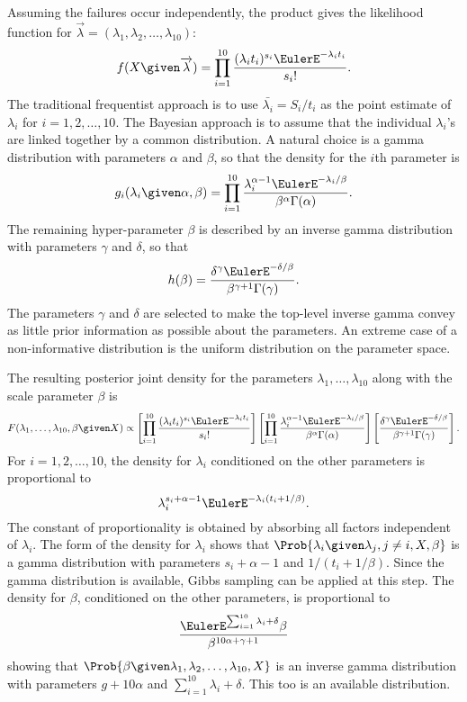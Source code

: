\documentclass[12pt]{article}
\begin{document}
Assuming the failures occur independently, the product gives the
likelihood function for \( \overrightarrow{\lambda} = (\lambda_1,
\lambda_2, \dots, \lambda_{10}) \):
\[
    f(X \given \overrightarrow{\lambda}) = \prod\limits_{i=1}^{10} \frac
    {(\lambda_i t_i)^{s_i} \EulerE^{-\lambda_i t_i}}{s_i!}.
\] The traditional frequentist approach is to use \( \bar{\lambda_i} = S_i/t_i
\) as the point estimate of \( \lambda_i \) for \( i = 1,2, \dots, 10 \).
The Bayesian approach is to assume that the individual \( \lambda_i \)'s
are linked together by a common distribution.  A natural choice is a
gamma distribution with parameters \( \alpha \) and \( \beta \), so that
the density for the \( i \)th parameter is
\[
    g_i(\lambda_i \given \alpha, \beta) =\prod\limits_{i=1}^{10} \frac{\lambda_i^
    {\alpha-1} \EulerE^{-\lambda_i/\beta}}{\beta^{\alpha} \Gamma(\alpha)}.
\] The remaining hyper-parameter \( \beta \) is described by an inverse
gamma distribution with parameters \( \gamma \) and \( \delta \), so
that
\[
    h(\beta) = \frac{\delta^{\gamma} \EulerE^{-\delta/\beta}}{\beta^{\gamma+1}
    \Gamma(\gamma)}.
\] The parameters \( \gamma \) and \( \delta \) are selected to make the
top-level inverse gamma convey as little prior information as possible
about the parameters.  An extreme case of a non-informative distribution
is the uniform distribution on the parameter space.

The resulting posterior joint density for the parameters \( \lambda_1,
 \dots, \lambda_{10} \) along with the scale parameter \(
\beta \) is
\[
    F(\lambda_1, \dots, \lambda_{10}, \beta \given X) \propto
    \left[ \prod_{i=1}^{10} \frac{(\lambda_i t_i)^{s_i} \EulerE^{-\lambda_i
    t_i}}{s_i!} \right] \left[ \prod_{i=1}^{10} \frac{\lambda_i^{\alpha-1}
    \EulerE^{-\lambda_i/\beta}}{\beta^{\alpha} \Gamma(\alpha)} \right]
    \left[ \frac{\delta^{\gamma} \EulerE^{-\delta/\beta}}{\beta^{\gamma+1}
    \Gamma(\gamma)} \right].
\] For \( i = 1,2, \dots, 10 \), the density for \( \lambda_i \)
conditioned on the other parameters is proportional to
\[
    \lambda_i^{s_i + \alpha -1} \EulerE^{-\lambda_i (t_i+1/\beta)}.
\] The constant of proportionality is obtained by absorbing all factors
independent of \( \lambda_i \).  The form of the density for \( \lambda_i
\) shows that \( \Prob{\lambda_i \given \lambda_j, j \ne i, X, \beta} \)
is a gamma distribution with parameters \( s_i + \alpha -1 \) and \( 1/(t_i
+ 1/\beta) \).  Since the gamma distribution is available, Gibbs
sampling can be applied at this step.  The density for \( \beta \),
conditioned on the other parameters, is proportional to
\[
    \frac{\EulerE^{\sum_{i=1}^{10}\lambda_i + \delta}\beta}{\beta^{10\alpha+\gamma+1}}
\] showing that \( \Prob{\beta \given \lambda_1, \lambda_2, \dots,
\lambda_{10}, X} \) is an inverse gamma distribution with parameters \(
g + 10 \alpha \) and \( \sum\limits_{i=1}^{10} \lambda_i+\delta \). This
too is an available distribution.
\end{document}
